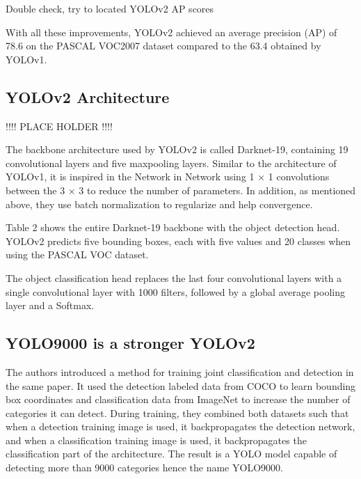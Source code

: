 \documentclass{article}
\begin{document}
Double check, try to located YOLOv2 AP scores

With all these improvements, YOLOv2 achieved an average precision (AP) of 78.6 on the PASCAL VOC2007 dataset compared to the 63.4 obtained by YOLOv1.

\subsection{YOLOv2 Architecture}

!!!! PLACE HOLDER !!!!


The backbone architecture used by YOLOv2 is called Darknet-19, containing 19 convolutional layers and five maxpooling layers. Similar to the architecture of YOLOv1, it is inspired in the Network in Network \cite{lin2013network} using 1 × 1 convolutions between the 3 × 3 to reduce the number of parameters. In addition, as mentioned above, they use batch normalization to regularize and help convergence.

Table 2 shows the entire Darknet-19 backbone with the object detection head. YOLOv2 predicts five bounding boxes, each with five values and 20 classes when using the PASCAL VOC dataset.

The object classification head replaces the last four convolutional layers with a single convolutional layer with 1000 filters, followed by a global average pooling layer and a Softmax.

\subsection{YOLO9000 is a stronger YOLOv2}

The authors introduced a method for training joint classification and detection in the same paper. It used the detection labeled data from COCO \cite{COCO} to learn bounding box coordinates and classification data from ImageNet to increase the number of categories it can detect. During training, they combined both datasets such that when a detection training image is used, it backpropagates the detection network, and when a classification training image is used, it backpropagates the classification part of the architecture. The result is a YOLO model capable of detecting more than 9000 categories hence the name YOLO9000.

\end{document}
